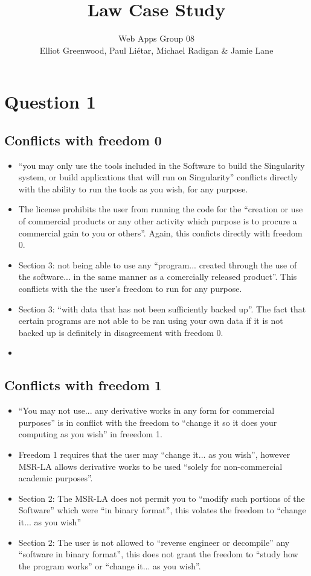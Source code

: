 \documentclass[a4paper, 6pt]{article}
\title{Law Case Study}
\author{Web Apps Group 08 \\ Elliot Greenwood, Paul Li\'etar, Michael Radigan \& Jamie Lane}
\date{}
\begin{document}
\maketitle
\section{Question 1}
\subsection{Conflicts with freedom 0}
\begin{itemize}
    \item ``you may only use the tools included in the Software to build the Singularity system, or build applications that will run on Singularity'' conflicts directly with the ability to run the tools as you wish, for any purpose.
    \item The license prohibits the user from running the code for the ``creation or use of commercial products or any other activity which purpose is to procure a commercial gain to you or others''. Again, this conficts directly with freedom 0.
    \item Section 3: not being able to use any ``program... created through the use of the software... in the same manner as a comercially released product''. This conflicts with the the user's freedom to run for any purpose.
    \item Section 3: ``with data that has not been sufficiently backed up''. The fact that certain programs are not able to be ran using your own data if it is not backed up is definitely in disagreement with freedom 0.
    \item 
\end{itemize}
\subsection{Conflicts with freedom 1}
\begin{itemize}    
    \item ``You may not use... any derivative works in any form for commercial purposes'' is in conflict with the freedom to ``change it so it does your computing as you wish'' in freeedom 1.
    \item Freedom 1 requires that the user may ``change it... as you wish'', however MSR-LA allows derivative works to be used ``solely for non-commercial academic purposes''.
    \item Section 2: The MSR-LA does not permit you to ``modify such portions of the Software'' which were ``in binary format'', this volates the freedom to ``change it... as you wish''
    \item Section 2: The user is not allowed to ``reverse engineer or decompile'' any ``software in binary format'', this does not grant the freedom to ``study how the program works'' or ``change it... as you wish''.
\end{itemize}
\end{document}
